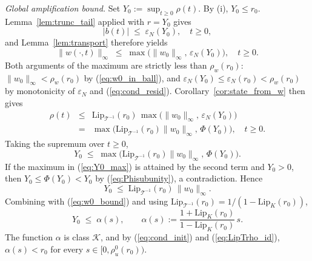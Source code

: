 \documentclass[amsthm]{autart}
\theoremstyle{plain}
\theoremstyle{definition}
\newcommand{\Tcal}{\mathcal{T}}
\newcommand{\Lipk}{\mathrm{Lip}_K}
\newcommand{\LipT}{\mathrm{Lip}_{\Tcal^{-1}}}
\newcommand{\eps}{\varepsilon}
\begin{document}
\emph{Global amplification bound.} Set $Y_0 := \sup_{t \ge 0}\rho(t)$.
By (i), $Y_0 \le r_0$. Lemma~\ref{lem:trunc_tail} applied with $r = Y_0$ gives
\begin{equation}
|b(t)| \;\le\; \eps_N(Y_0), \quad t \ge 0,
\label{eq:b_bounded_Y0}
\end{equation}
and Lemma~\ref{lem:transport} therefore yields
\begin{equation}
\|w(\cdot,t)\|_\infty \;\le\; \max\bigl(\|w_0\|_\infty,\, \eps_N(Y_0)\bigr), \quad t \ge 0.
\label{eq:w_norm_Y0}
\end{equation}
Both arguments of the maximum are strictly less than $\rho_w(r_0)$: $\|w_0\|_\infty < \rho_w(r_0)$ by (\ref{eq:w0_in_ball}), and $\eps_N(Y_0) \le \eps_N(r_0) < \rho_w(r_0)$ by monotonicity of $\eps_N$ and (\ref{eq:cond_resid}). Corollary~\ref{cor:state_from_w} then gives
\begin{eqnarray}
\rho(t) &\le& \LipT(r_0)\,\max\bigl(\|w_0\|_\infty,\, \eps_N(Y_0)\bigr) \nonumber \\
&=& \max\bigl(\LipT(r_0)\|w_0\|_\infty,\, \Phi(Y_0)\bigr), \quad t \ge 0.
\label{eq:rho_max}
\end{eqnarray}
Taking the supremum over $t \ge 0$,
\begin{equation}
Y_0 \;\le\; \max\bigl(\LipT(r_0)\|w_0\|_\infty,\, \Phi(Y_0)\bigr).
\label{eq:Y0_max}
\end{equation}
If the maximum in (\ref{eq:Y0_max}) is attained by the second term and $Y_0 > 0$, then $Y_0 \le \Phi(Y_0) < Y_0$ by (\ref{eq:Phisubunity}), a contradiction. Hence
\begin{equation}
Y_0 \;\le\; \LipT(r_0)\,\|w_0\|_\infty.
\label{eq:Y0_linear}
\end{equation}
Combining with (\ref{eq:w0_bound}) and using $\LipT(r_0) = 1/(1 - \Lipk(r_0))$,
\begin{equation}
Y_0 \;\le\; \alpha(s), \qquad \alpha(s) := \frac{1 + \Lipk(r_0)}{1 - \Lipk(r_0)}\, s.
\label{eq:Y0_alpha}
\end{equation}
The function $\alpha$ is class $\mathcal{K}$, and by (\ref{eq:cond_init}) and (\ref{eq:LipTrho_id}), $\alpha(s) < r_0$ for every $s \in [0, \rho_u^0(r_0))$.
\end{document}

